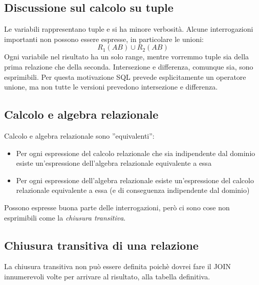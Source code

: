 \subsection{Discussione sul calcolo su tuple}
Le variabili rappresentano tuple e si ha minore verbosità. Alcune interrogazioni importanti non possono essere espresse, in particolare le unioni:
\[R_1(AB) \cup R_2(AB)\]
Ogni variabile nel risultato ha un solo range, mentre vorremmo tuple sia della prima relazione che della seconda. Intersezione e differenza, comunque sia, sono esprimibili. Per questa motivazione SQL prevede esplicitamente un operatore unione, ma non tutte le versioni prevedono intersezione e differenza.
\subsection{Calcolo e algebra relazionale}
Calcolo e algebra relazionale sono ''equivalenti'':
\begin{itemize}
	\item Per ogni espressione del calcolo relazionale che sia indipendente dal dominio esiste un'espressione dell'algebra relazionale equivalente a essa
	\item Per ogni espressione dell'algebra relazionale esiste un'espressione del calcolo relazionale equivalente a essa (e di conseguenza indipendente dal dominio)
\end{itemize}
Possono espresse buona parte delle interrogazioni, però ci sono cose non esprimibili come la \emph{chiusura transitiva}.
\subsection{Chiusura transitiva di una relazione}
La chiusura transitiva non può essere definita poichè dovrei fare il JOIN innumerevoli volte per arrivare al risultato, alla tabella definitiva.
